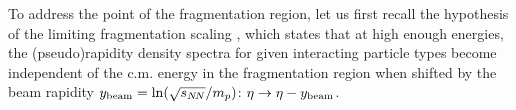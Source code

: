 \documentclass[twocolumn,showpacs,preprintnumbers,prd,superscriptaddress,nofootinbib]{revtex4}
\begin{document}

   To address the point of 
 the fragmentation region, let us first recall the 
hypothesis 
of the limiting fragmentation scaling 
 , which 
 states
   that at high enough energies, the (pseudo)rapidity density spectra for 
 given interacting particle types become 
   independent of the c.m. energy in the fragmentation region when shifted 
by 
the beam rapidity $y_{\rm beam}
    = \ln(\sqrt{s_{N\!N}}/m_p)$: $\eta\to \eta -y_{\rm beam}$. 
\end{document}
